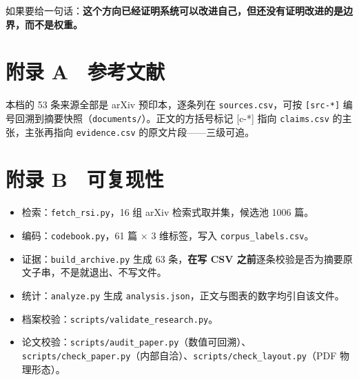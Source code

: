 如果要给一句话：\textbf{这个方向已经证明系统可以改进自己，但还没有证明改进的是边界，而不是权重。}


\section{附录 A　参考文献}

本档的 53 条来源全部是 arXiv 预印本，逐条列在 \texttt{sources.csv}，可按 \texttt{[src-*]} 编号回溯到摘要快照（\texttt{documents/}）。正文的方括号标记 [c-*] 指向 \texttt{claims.csv} 的主张，主张再指向 \texttt{evidence.csv} 的原文片段——三级可追。


\section{附录 B　可复现性}

\begin{itemize}
  \item 检索：\texttt{fetch\_rsi.py}，16 组 arXiv 检索式取并集，候选池 1006 篇。
  \item 编码：\texttt{codebook.py}，61 篇 × 3 维标签，写入 \texttt{corpus\_labels.csv}。
  \item 证据：\texttt{build\_archive.py} 生成 63 条，\textbf{在写 CSV 之前}逐条校验是否为摘要原文子串，不是就退出、不写文件。
  \item 统计：\texttt{analyze.py} 生成 \texttt{analysis.json}，正文与图表的数字均引自该文件。
  \item 档案校验：\texttt{scripts/validate\_research.py}。
  \item 论文校验：\texttt{scripts/audit\_paper.py}（数值可回溯）、\texttt{scripts/check\_paper.py}（内部自洽）、\texttt{scripts/check\_layout.py}（PDF 物理形态）。
\end{itemize}